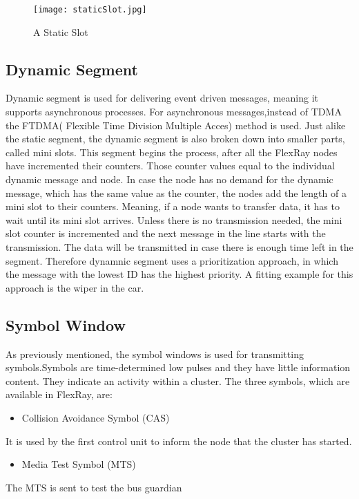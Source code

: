 \documentclass[conference]{IEEEtran}
\begin{document}
\begin{figure}[htbp]
 \centerline{ \texttt{[image: staticSlot.jpg]}}
  \caption{A Static Slot}
  \label{fig:slot}
\end{figure}

\subsection{Dynamic Segment}
Dynamic segment is used for delivering event driven messages, meaning it supports asynchronous processes. For asynchronous messages,instead of TDMA the FTDMA( Flexible Time Division Multiple Acces) method is used. Just alike the static segment, the dynamic segment is also broken down into smaller parts, called mini slots. This segment begins the process, after all the FlexRay nodes have incremented their counters. Those counter values equal to the individual dynamic message and node. In case the node has no demand for the dynamic message, which has the same value as the counter, the nodes add the length of a mini slot to their counters. Meaning, if a node wants to transfer data, it has to wait until its mini slot arrives. Unless there is no transmission needed, the mini slot counter is incremented and the next message in the line starts with the transmission. The data will be transmitted in case there is enough time left in the segment. Therefore dynamnic segment uses a prioritization approach, in which the  message with the lowest ID has the highest priority. A fitting example for this approach is the wiper in the car.

\subsection{Symbol Window}
As previously mentioned, the symbol windows is used for transmitting symbols.Symbols  are time-determined low pulses and they have little information content. They indicate an activity within a cluster. The three symbols, which are available in FlexRay, are:

\begin{itemize}
  \item Collision Avoidance Symbol (CAS)
\end{itemize}
It is used by the first control unit to inform the node that the cluster has started.

\begin{itemize}
  \item Media Test Symbol (MTS)
\end{itemize}
The MTS is sent to test the bus guardian
\end{document}
